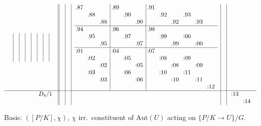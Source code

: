 \documentclass[11pt,a4paper]{amsart}
\begin{document}
\begin{align*}
\begin{array}{r||c|c|c|c|c}
\begin{array}{c|c|c|c|c|c|c|c}
&&&&&&&\\
&&&&&&&\\
&&&&&&&\\
&&&&&&&\\
  \end{array}
&&&
  \begin{array}{ccc|ccc|cccccc}
    \llap.87 &&& \llap.89 &&& \llap.91 &&&&& \\
    & \llap.88 &&& \llap.90 &&& \llap.92 && \llap.93 && \\
    && \llap.88 &&& \llap.90 &&& \llap.92 && \llap.93 & \\
\hline
    \llap.94 &&& \llap.96 &&& \llap.98 &&&&& \\
    & \llap.95 &&& \llap.97 &&& \llap.99 && \llap:00 && \\
    && \llap.95 &&& \llap.97 &&& \llap.99 && \llap:00 & \\
\hline
    \llap:01 &&& \llap:04 &&& \llap:07 &&&&& \\
    & \llap:02 &&& \llap:05 &&& \llap:08 && \llap:09 && \\
    && \llap:02 &&& \llap:05 &&& \llap:08 && \llap:09 & \\
    & \llap:03 &&& \llap:06 &&& \llap:10 && \llap:11 && \\
    && \llap:03 &&& \llap:06 &&& \llap:10 && \llap:11 & \\
    &&&&&&&&&&& \llap:12 \\
  \end{array}
&\\ \hline
    \begin{array}{r}
      D_8/1 \\ \\
    \end{array}
    &
&&&&
          \begin{array}{cc}
            \llap:13 & \\
            & \llap:14 \\
          \end{array}
\\
  \end{array}
\end{align*}

\newcommand{\Aut}{\mathrm{Aut}}

Basis: $([P/K], \chi)$, $\chi$ irr.\ constituent of $\Aut(U)$ acting
on $\{P/K \to U\}/G$.
\end{document}
